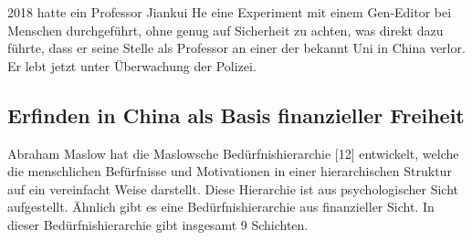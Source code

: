 \documentclass[11pt,a4paper]{article}
\begin{document}
2018 hatte ein Professor Jiankui He eine Experiment mit einem Gen-Editor bei
Menschen durchgeführt, ohne genug auf Sicherheit zu achten, was direkt dazu
führte, dass er seine Stelle als Professor an einer der bekannt Uni in China
verlor. Er lebt jetzt unter Überwachung der Polizei.

\subsection{Erfinden in China als Basis finanzieller Freiheit}

Abraham Maslow hat die Maslowsche Bedürfnishierarchie [12] entwickelt, welche
die menschlichen Befürfnisse und Motivationen in einer hierarchischen Struktur
auf ein vereinfacht Weise darstellt. Diese Hierarchie ist aus psychologischer
Sicht aufgestellt. Ähnlich gibt es eine Bedürfnishierarchie aus finanzieller
Sicht. In dieser Bedürfnishierarchie gibt insgesamt 9 Schichten.
\end{document}
